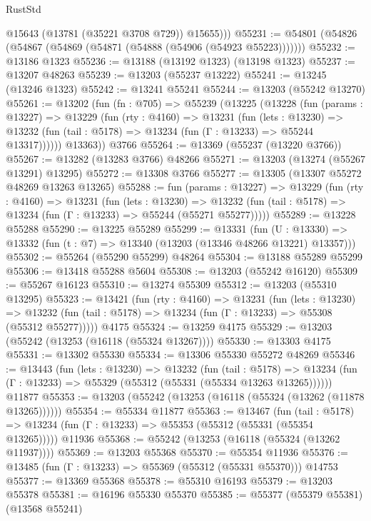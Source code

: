 \begin{lexlean}{RustStd}
\begin{coremodule}
          @15643
          (@13781 (@35221 @3708 @729))
          @15655)))
@55231 := @54801 (@54826 (@54867 (@54869 (@54871 (@54888 (@54906 (@54923 @55223)))))))
@55232 := @13186 @1323
@55236 := @13188 (@13192 @1323) (@13198 @1323)
@55237 := @13207 @48263
@55239 := @13203 (@55237 @13222)
@55241 := @13245 (@13246 @1323)
@55242 := @13241 @55241
@55244 := @13203 (@55242 @13270)
@55261 := @13202
    (fun (fn : @705) =>
    @55239
      (@13225
        (@13228
          (fun (params : @13227) =>
          @13229
            (fun (rty : @4160) =>
            @13231
              (fun (lets : @13230) =>
              @13232 (fun (tail : @5178) => @13234 (fun (Γ : @13233) => @55244 @13317))))))
        @13363))
    @3766
@55264 := @13369 (@55237 (@13220 @3766))
@55267 := @13282 (@13283 @3766) @48266
@55271 := @13203 (@13274 (@55267 @13291) @13295)
@55272 := @13308 @3766
@55277 := @13305 (@13307 @55272 @48269 @13263 @13265)
@55288 := fun (params : @13227) =>
  @13229
    (fun (rty : @4160) =>
    @13231
      (fun (lets : @13230) =>
      @13232 (fun (tail : @5178) => @13234 (fun (Γ : @13233) => @55244 (@55271 @55277)))))
@55289 := @13228 @55288
@55290 := @13225 @55289
@55299 := @13331
    (fun (U : @13330) => @13332 (fun (t : @7) => @13340 (@13203 (@13346 @48266 @13221) @13357)))
@55302 := @55264 (@55290 @55299) @48264
@55304 := @13188 @55289 @55299
@55306 := @13418 @55288 @5604
@55308 := @13203 (@55242 @16120)
@55309 := @55267 @16123
@55310 := @13274 @55309
@55312 := @13203 (@55310 @13295)
@55323 := @13421
    (fun (rty : @4160) =>
    @13231
      (fun (lets : @13230) =>
      @13232 (fun (tail : @5178) => @13234 (fun (Γ : @13233) => @55308 (@55312 @55277)))))
    @4175
@55324 := @13259 @4175
@55329 := @13203 (@55242 (@13253 (@16118 (@55324 @13267))))
@55330 := @13303 @4175
@55331 := @13302 @55330
@55334 := @13306 @55330 @55272 @48269
@55346 := @13443
    (fun (lets : @13230) =>
    @13232
      (fun (tail : @5178) =>
      @13234 (fun (Γ : @13233) => @55329 (@55312 (@55331 (@55334 @13263 @13265))))))
    @11877
@55353 := @13203 (@55242 (@13253 (@16118 (@55324 (@13262 (@11878 @13265))))))
@55354 := @55334 @11877
@55363 := @13467
    (fun (tail : @5178) => @13234 (fun (Γ : @13233) => @55353 (@55312 (@55331 (@55354 @13265)))))
    @11936
@55368 := @55242 (@13253 (@16118 (@55324 (@13262 @11937))))
@55369 := @13203 @55368
@55370 := @55354 @11936
@55376 := @13485 (fun (Γ : @13233) => @55369 (@55312 (@55331 @55370))) @14753
@55377 := @13369 @55368
@55378 := @55310 @16193
@55379 := @13203 @55378
@55381 := @16196 @55330 @55370
@55385 := @55377 (@55379 @55381) (@13568 @55241)

\end{coremodule}
\end{lexlean}
